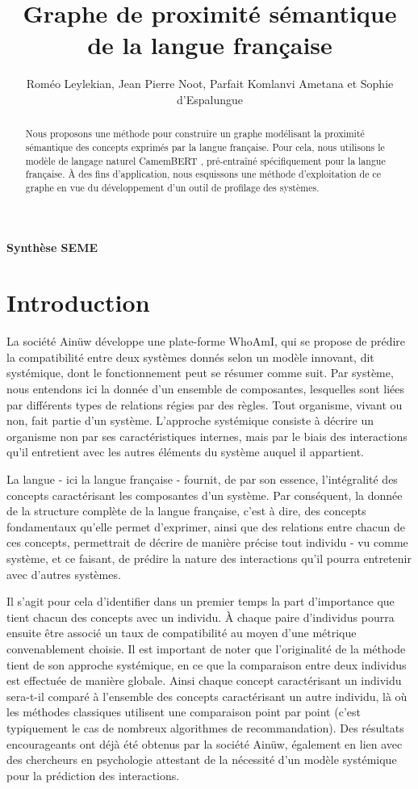 \documentclass{amsart}
\title{Graphe de proximité sémantique de la langue française}
\author{Roméo Leylekian, Jean Pierre Noot, Parfait Komlanvi Ametana et Sophie d'Espalungue}
\begin{document}
\maketitle
\begin{center}
    \textbf{Synthèse SEME}
\end{center} 
\begin{abstract}
    Nous proposons une méthode pour construire un graphe modélisant la proximité sémantique des concepts exprimés par la langue française. Pour cela, nous utilisons le modèle de langage naturel CamemBERT \cite{martin-etal-2020-camembert, martin:hal-02784755}, pré-entraîné spécifiquement pour la langue française. À des fins d'application, nous esquissons une méthode d'exploitation de ce graphe en vue du développement d'un outil de profilage des systèmes.
\end{abstract}

\section{Introduction}

La société Ainüw développe une plate-forme WhoAmI, qui se propose de prédire la compatibilité entre deux systèmes donnés selon un modèle innovant, dit systémique, dont le fonctionnement peut se résumer comme suit. Par système, nous entendons ici la donnée d'un ensemble de composantes, lesquelles sont liées par différents types de relations régies par des règles. Tout organisme, vivant ou non, fait partie d'un système. L'approche systémique consiste à décrire un organisme non par ses caractéristiques internes, mais par le biais des interactions qu'il entretient avec les autres éléments du système auquel il appartient.

La langue - ici la langue française - fournit, de par son essence, l'intégralité des concepts caractérisant les composantes d'un système. Par conséquent, la donnée de la structure complète de la langue française, c'est à dire, des concepts fondamentaux qu'elle permet d'exprimer, ainsi que des relations entre chacun de ces concepts, permettrait de décrire de manière précise tout individu - vu comme système, et ce faisant, de prédire la nature des interactions qu'il pourra entretenir avec d'autres systèmes.

Il s'agit pour cela d'identifier dans un premier temps la part d'importance que tient chacun des concepts avec un individu. À chaque paire d'individus pourra ensuite être associé un taux de compatibilité au moyen d'une métrique convenablement choisie. Il est important de noter que l'originalité de la méthode tient de son approche systémique, en ce que la comparaison entre deux individus est effectuée de manière globale. Ainsi chaque concept caractérisant un individu sera-t-il comparé à l'ensemble des concepts caractérisant un autre individu, là où les méthodes classiques utilisent une comparaison point par point (c'est typiquement le cas de nombreux algorithmes de recommandation). Des résultats encourageants ont déjà été obtenus par la société Ainüw, également en lien avec des chercheurs en psychologie attestant de la nécessité d'un modèle systémique pour la prédiction des interactions. 
\end{document}
